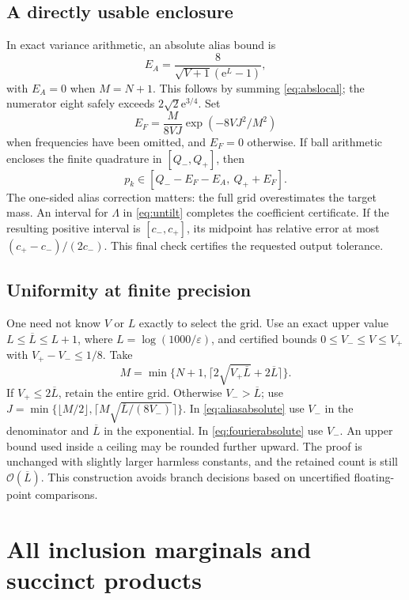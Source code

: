 \documentclass[11pt,a4paper]{article}
\theoremstyle{definition}
\newcommand{\ee}{\mathrm e}
\newcommand{\BigO}{\mathcal O}
\begin{document}
\subsection{A directly usable enclosure}

In exact variance arithmetic, an absolute alias bound is
\begin{equation}\label{eq:aliasabsolute}
 E_A=\frac{8}{\sqrt{V+1}(\ee^L-1)},
\end{equation}
with $E_A=0$ when $M=N+1$. This follows by summing \eqref{eq:abslocal}; the numerator eight safely exceeds $2\sqrt2\ee^{3/4}$. Set
\begin{equation}\label{eq:fourierabsolute}
 E_F=\frac{M}{8VJ}\exp(-8VJ^2/M^2)
\end{equation}
when frequencies have been omitted, and $E_F=0$ otherwise. If ball arithmetic encloses the finite quadrature in $[Q_-,Q_+]$, then
\begin{equation}\label{eq:enclosure}
 p_k\in[Q_- -E_F-E_A,\ Q_+ +E_F].
\end{equation}
The one-sided alias correction matters: the full grid overestimates the target mass. An interval for $\Lambda$ in \eqref{eq:untilt} completes the coefficient certificate. If the resulting positive interval is $[c_-,c_+]$, its midpoint has relative error at most
$(c_+-c_-)/(2c_-)$. This final check certifies the requested output tolerance.

\subsection{Uniformity at finite precision}

One need not know $V$ or $L$ exactly to select the grid. Use an exact upper value $L\le\overline L\le L+1$, where $L=\log(1000/\varepsilon)$, and certified bounds $0\le V_-\le V\le V_+$ with $V_+-V_-\le1/8$. Take
\[
 M=\min\{N+1,\lceil2\sqrt{V_+\overline L}+2\overline L\rceil\}.
\]
If $V_+\le2\overline L$, retain the entire grid. Otherwise $V_->\overline L$; use
$J=\min\{\lfloor M/2\rfloor,\lceil M\sqrt{\overline L/(8V_-)}\rceil\}$.
In \eqref{eq:aliasabsolute} use $V_-$ in the denominator and $\overline L$ in the exponential. In \eqref{eq:fourierabsolute} use $V_-$. An upper bound used inside a ceiling may be rounded further upward. The proof is unchanged with slightly larger harmless constants, and the retained count is still $\BigO(\overline L)$. This construction avoids branch decisions based on uncertified floating-point comparisons.

\section{All inclusion marginals and succinct products}\label{sec:marginals}
\end{document}
